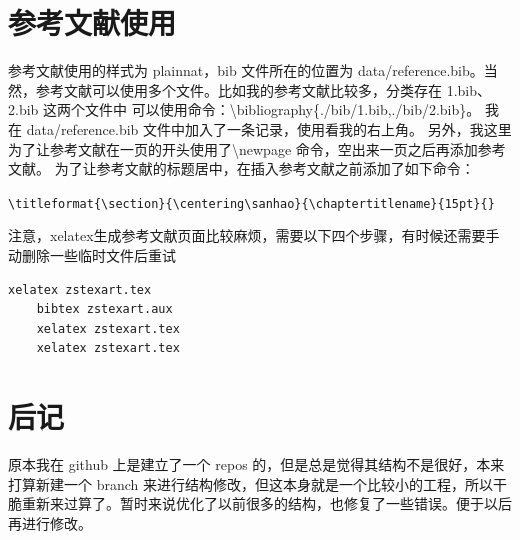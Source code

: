 \documentclass[a4paper,12pt]{ctexart}
\begin{document}
\section{参考文献使用}
参考文献使用的样式为 plainnat，bib 文件所在的位置为 data/reference.bib。当然，参考文献可以使用多个文件。比如我的参考文献比较多，分类存在 1.bib、2.bib 这两个文件中
可以使用命令：\textbackslash{}bibliography\{./bib/1.bib,./bib/2.bib\}。
我在 data/reference.bib 文件中加入了一条记录，使用看我的右上角\cite{刘海洋2013latex}。
另外，我这里为了让参考文献在一页的开头使用了\textbackslash{}newpage 命令，空出来一页之后再添加参考文献。
为了让参考文献的标题居中，在插入参考文献之前添加了如下命令：

\verb|\titleformat{\section}{\centering\sanhao}{\chaptertitlename}{15pt}{}|

注意，xelatex生成参考文献页面比较麻烦，需要以下四个步骤，有时候还需要手动删除一些临时文件后重试

\begin{lstlisting}[language=bash]
    xelatex zstexart.tex
    bibtex zstexart.aux
    xelatex zstexart.tex
    xelatex zstexart.tex
\end{lstlisting}

\section{后记}
原本我在 github 上是建立了一个 repos 的，但是总是觉得其结构不是很好，本来打算新建一个 branch 来进行结构修改，但这本身就是一个比较小的工程，所以干脆重新来过算了。暂时来说优化了以前很多的结构，也修复了一些错误。便于以后再进行修改。

\newpage
\titleformat{\section}{\centering\sanhao}{\chaptertitlename}{15pt}{}


\end{document}
